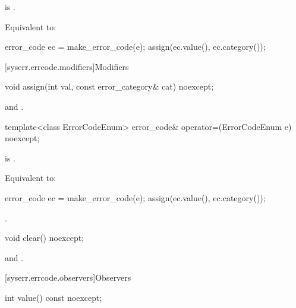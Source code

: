 \begin{itemdescr}
\pnum
\constraints
{} is .

\pnum
\effects
Equivalent to:
\begin{codeblock}
error_code ec = make_error_code(e);
assign(ec.value(), ec.category());
\end{codeblock}
\end{itemdescr}

[syserr.errcode.modifiers]{Modifiers}

%
\begin{itemdecl}
void assign(int val, const error_category& cat) noexcept;
\end{itemdecl}

\begin{itemdescr}
\pnum
\ensures
{} and .
\end{itemdescr}

%
\begin{itemdecl}
template<class ErrorCodeEnum>
  error_code& operator=(ErrorCodeEnum e) noexcept;
\end{itemdecl}

\begin{itemdescr}
\pnum
\constraints
{} is .

\pnum
\effects
Equivalent to:
\begin{codeblock}
error_code ec = make_error_code(e);
assign(ec.value(), ec.category());
\end{codeblock}

\pnum
\returns
{}.
\end{itemdescr}

%
\begin{itemdecl}
void clear() noexcept;
\end{itemdecl}

\begin{itemdescr}
\pnum
\ensures
{} and .
\end{itemdescr}


[syserr.errcode.observers]{Observers}

%
\begin{itemdecl}
int value() const noexcept;
\end{itemdecl}

